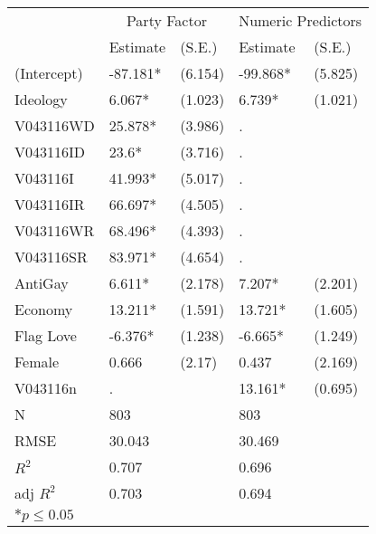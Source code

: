 \begin{tabular}{*{5}{l}}
 \hline
                &\multicolumn{2}{c}{Party Factor} &\multicolumn{2}{c}{Numeric Predictors}   \\
                &Estimate &(S.E.)  &Estimate &(S.E.) \\
 \hline
 \hline
  (Intercept)    & -87.181*  &   (6.154) & -99.868*  &   (5.825) \\
  Ideology       &  6.067*  &   (1.023) &  6.739*  &   (1.021) \\
  V043116WD      &  25.878*  &   (3.986)  & .       &         \\
  V043116ID      &  23.6*  &   (3.716)  & .       &         \\
  V043116I       &  41.993*  &   (5.017)  & .       &         \\
  V043116IR      &  66.697*  &   (4.505)  & .       &         \\
  V043116WR      &  68.496*  &   (4.393)  & .       &         \\
  V043116SR      &  83.971*  &   (4.654)  & .       &         \\
  AntiGay        &  6.611*  &   (2.178) &  7.207*  &   (2.201) \\
  Economy        &  13.211*  &   (1.591) &  13.721*  &   (1.605) \\
  Flag Love      & -6.376*  &   (1.238) & -6.665*  &   (1.249) \\
  Female         &  0.666  &   (2.17) &  0.437  &   (2.169) \\
  V043116n        & .       &         &  13.161*  &   (0.695) \\
 \hline 
 N                &803      &      &803      &       \\
 RMSE            &30.043        &&30.469        & \\
 $R^2$           &0.707        &&0.696        & \\
 adj $R^2$       &0.703        &&0.694        & \\
 \hline
 \hline
 
 \multicolumn{2}{l}{${*}  p \le 0.05$   }\\
 \end{tabular}